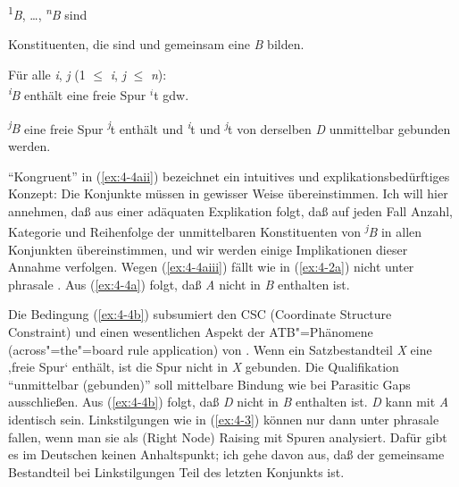 \documentclass[output=paper]{langsci/langscibook}
\begin{document}
\begin{exe}
\ex
\label{ex:4-4}
\begin{xlist}
\ex%
\label{ex:4-4a}
\textsuperscript{1}\textit{B}, \ldots, \textit{\textsuperscript{n}}\textit{B} sind 
\begin{xlist}
\ex%
{\label{ex:4-4ai}
Konstituenten, die }
\ex%
{\label{ex:4-4aii}
 sind und }
\ex%
{\label{ex:4-4aiii}
gemeinsam eine  \textit{B} bilden.}
\end{xlist}
\ex%
\label{ex:4-4b}
Für alle \textit{i}, \textit{j} (1 ${\leq}$ \textit{i}, \textit{j} ${\leq}$ \textit{n}): \\
\textit{\textsuperscript{i}}\textit{B} enthält eine freie Spur $^i$t gdw.
\begin{xlist}
\ex%
\label{ex:4-4bi}
\textit{\textsuperscript{j}}\textit{B} eine freie Spur \textit{\textsuperscript{j}}t enthält und
\ex%
\label{ex:4-4bii}
\textsuperscript{\textit{i}}t und \textsuperscript{\textit{j}}t von derselben  \textit{D} unmittelbar gebunden werden.
\end{xlist}
\end{xlist}
\end{exe}
"`Kongruent"' in (\ref{ex:4-4aii}) bezeichnet ein intuitives und explikationsbedürftiges Konzept: Die Konjunkte müssen in gewisser Weise übereinstimmen. Ich will hier annehmen, daß aus einer adäquaten Explikation folgt, daß auf jeden Fall Anzahl, Kategorie und Reihenfolge der unmittelbaren Konstituenten von \textit{\textsuperscript{j}}\textit{B} in allen Konjunkten übereinstimmen, und wir werden einige Implikationen dieser Annahme verfolgen. Wegen (\ref{ex:4-4aiii}) fällt  wie in (\ref{ex:4-2a}) nicht unter phrasale . Aus (\ref{ex:4-4a}) folgt, daß \textit{A} nicht in \textit{B} enthalten ist.

Die Bedingung (\ref{ex:4-4b}) subsumiert den CSC (Coordinate Structure Constraint) und einen wesentlichen Aspekt der ATB"=Phänomene (across"=the"=board rule application) von \citet[§4.2]{Ross1967}. Wenn ein Satzbestandteil \textit{X} eine ‚freie Spur‘ enthält, ist die Spur nicht in \textit{X} gebunden. Die Qualifikation "`unmittelbar (gebunden)"' soll mittelbare Bindung wie bei Parasitic Gaps ausschließen. Aus (\ref{ex:4-4b}) folgt, daß \textit{D} nicht in \textit{B} enthalten ist. \textit{D} kann mit \textit{A} identisch sein. Linkstilgungen wie in (\ref{ex:4-3}) können nur dann unter phrasale  fallen, wenn man sie als (Right Node) Raising mit Spuren analysiert. Dafür gibt es im Deutschen keinen Anhaltspunkt; ich gehe davon aus, daß der gemeinsame Bestandteil bei Linkstilgungen Teil des letzten Konjunkts ist.
\end{document}
